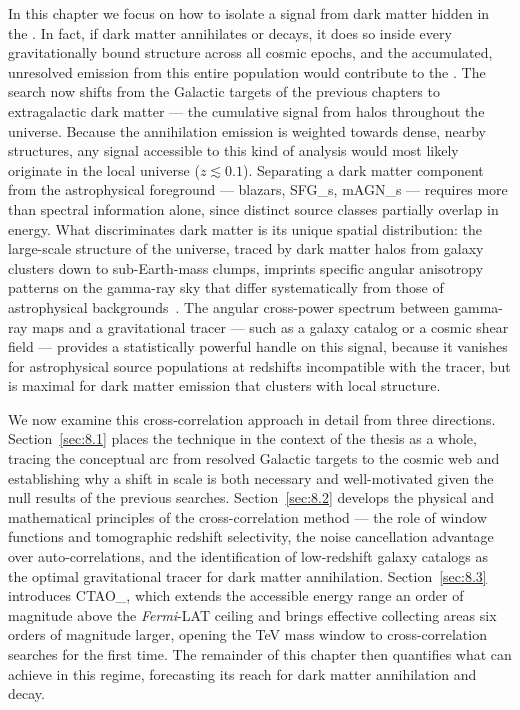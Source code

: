 In this chapter we focus on how to isolate a signal from dark matter hidden in the \UGRB.
In fact, if dark matter annihilates or decays, it does so inside every gravitationally bound structure across all cosmic epochs,
and the accumulated, unresolved emission from this entire population would contribute to the \UGRB.
The search now shifts from the Galactic targets of the previous chapters to extragalactic dark matter --- the cumulative signal from halos throughout the universe. Because the annihilation emission is weighted towards dense, nearby structures, any signal accessible to this kind of analysis would most likely originate in the local universe ($z \lesssim 0.1$).
Separating a dark matter component from the astrophysical foreground --- blazars, \glspl{SFG_}, \glspl{mAGN_} --- requires more than spectral information alone, since distinct source classes partially overlap in energy.
%
What discriminates dark matter is its unique spatial distribution: the large-scale structure of the universe, traced by dark matter halos from galaxy clusters down to sub-Earth-mass clumps, imprints specific angular anisotropy patterns on the gamma-ray sky that differ systematically from those of astrophysical backgrounds~\cite{DGRB-review,Fornengo:2013rga,Camera:2012cj}.
%
The angular cross-power spectrum between gamma-ray maps and a gravitational tracer --- such as a galaxy catalog or a cosmic shear field --- provides a statistically powerful handle on this signal, because it vanishes for astrophysical source populations at redshifts incompatible with the tracer, but is maximal for dark matter emission that clusters with local structure.

We now examine this cross-correlation approach in detail from three directions.
Section~\ref{sec:8.1} places the technique in the context of the thesis as a whole, tracing the conceptual arc from resolved Galactic targets to the cosmic web and establishing why a shift in scale is both necessary and well-motivated given the null results of the previous searches. Section~\ref{sec:8.2} develops the physical and mathematical principles of the cross-correlation method --- the role of window functions and tomographic redshift selectivity, the noise cancellation advantage over auto-correlations, and the identification of low-redshift galaxy catalogs as the optimal gravitational tracer for dark matter annihilation. Section~\ref{sec:8.3} introduces \gls{CTAO_}, which extends the accessible energy range an order of magnitude above the \textit{Fermi}-LAT ceiling and brings effective collecting areas six orders of magnitude larger, opening the TeV mass window to cross-correlation searches for the first time.
The remainder of this chapter then quantifies what \CTAO can achieve in this regime, forecasting its reach for dark matter annihilation and decay.
